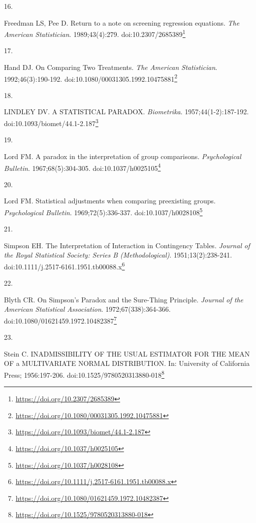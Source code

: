 \documentclass[
  a4paper,
]{book}
\newlength{\cslhangindent}
\newlength{\csllabelwidth}
\newlength{\cslentryspacingunit} %
\newenvironment{CSLReferences}[2] %
 {%
  \setlength{\parindent}{0pt}
  \ifodd #1
  \let\oldpar\par
  \def\par{\hangindent=\cslhangindent\oldpar}
  \fi
  \setlength{\parskip}{#2\cslentryspacingunit}
 }%
 {}
\newcommand{\CSLLeftMargin}[1]{\parbox[t]{\csllabelwidth}{#1}}
\newcommand{\CSLRightInline}[1]{\parbox[t]{\linewidth - \csllabelwidth}{#1}\break}
\renewcommand{\href}[2]{#2\footnote{\url{#1}}}
\begin{document}
\begin{CSLReferences}{0}{0}
\leavevmode{}%
\CSLLeftMargin{16. }%
\CSLRightInline{Freedman LS, Pee D. Return to a note on screening regression equations. \emph{The American Statistician}. 1989;43(4):279. doi:\href{https://doi.org/10.2307/2685389}{10.2307/2685389}}

\leavevmode{}%
\CSLLeftMargin{17. }%
\CSLRightInline{Hand DJ. On Comparing Two Treatments. \emph{The American Statistician}. 1992;46(3):190-192. doi:\href{https://doi.org/10.1080/00031305.1992.10475881}{10.1080/00031305.1992.10475881}}

\leavevmode{}%
\CSLLeftMargin{18. }%
\CSLRightInline{LINDLEY DV. A STATISTICAL PARADOX. \emph{Biometrika}. 1957;44(1-2):187-192. doi:\href{https://doi.org/10.1093/biomet/44.1-2.187}{10.1093/biomet/44.1-2.187}}

\leavevmode{}%
\CSLLeftMargin{19. }%
\CSLRightInline{Lord FM. A paradox in the interpretation of group comparisons. \emph{Psychological Bulletin}. 1967;68(5):304-305. doi:\href{https://doi.org/10.1037/h0025105}{10.1037/h0025105}}

\leavevmode{}%
\CSLLeftMargin{20. }%
\CSLRightInline{Lord FM. Statistical adjustments when comparing preexisting groups. \emph{Psychological Bulletin}. 1969;72(5):336-337. doi:\href{https://doi.org/10.1037/h0028108}{10.1037/h0028108}}

\leavevmode{}%
\CSLLeftMargin{21. }%
\CSLRightInline{Simpson EH. The Interpretation of Interaction in Contingency Tables. \emph{Journal of the Royal Statistical Society: Series B (Methodological)}. 1951;13(2):238-241. doi:\href{https://doi.org/10.1111/j.2517-6161.1951.tb00088.x}{10.1111/j.2517-6161.1951.tb00088.x}}

\leavevmode{}%
\CSLLeftMargin{22. }%
\CSLRightInline{Blyth CR. On Simpson's Paradox and the Sure-Thing Principle. \emph{Journal of the American Statistical Association}. 1972;67(338):364-366. doi:\href{https://doi.org/10.1080/01621459.1972.10482387}{10.1080/01621459.1972.10482387}}

\leavevmode{}%
\CSLLeftMargin{23. }%
\CSLRightInline{Stein C. INADMISSIBILITY OF THE USUAL ESTIMATOR FOR THE MEAN OF a MULTIVARIATE NORMAL DISTRIBUTION. In: University of California Press; 1956:197-206. doi:\href{https://doi.org/10.1525/9780520313880-018}{10.1525/9780520313880-018}}


\end{CSLReferences}
\end{document}
